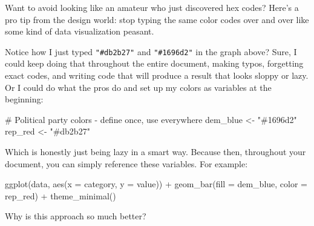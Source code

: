 \documentclass[
  letterpaper,
]{book}
\newenvironment{Shaded}{\begin{snugshade}}{\end{snugshade}}
\newcommand{\AttributeTok}[1]{\textcolor[rgb]{0.40,0.45,0.13}{#1}}
\newcommand{\CommentTok}[1]{\textcolor[rgb]{0.37,0.37,0.37}{#1}}
\newcommand{\FunctionTok}[1]{\textcolor[rgb]{0.28,0.35,0.67}{#1}}
\newcommand{\NormalTok}[1]{\textcolor[rgb]{0.00,0.23,0.31}{#1}}
\newcommand{\OtherTok}[1]{\textcolor[rgb]{0.00,0.23,0.31}{#1}}
\newcommand{\SpecialCharTok}[1]{\textcolor[rgb]{0.37,0.37,0.37}{#1}}
\newcommand{\StringTok}[1]{\textcolor[rgb]{0.13,0.47,0.30}{#1}}
\begin{document}
\begin{tcolorbox}[enhanced jigsaw, colframe=quarto-callout-tip-color-frame, breakable, arc=.35mm, bottomtitle=1mm, bottomrule=.15mm, colbacktitle=quarto-callout-tip-color!10!white, rightrule=.15mm, colback=white, opacityback=0, opacitybacktitle=0.6, coltitle=black, left=2mm, toptitle=1mm, toprule=.15mm, titlerule=0mm, leftrule=.75mm, title=\textcolor{quarto-callout-tip-color}{\faLightbulb}\hspace{0.5em}{May the Format Be With You: Brand Consistency (or: How to Look Like You
Actually Know What You're Doing)}]

Want to avoid looking like an amateur who just discovered hex codes?
Here's a pro tip from the design world: stop typing the same color codes
over and over like some kind of data visualization peasant.

Notice how I just typed \texttt{"\#db2b27"} and \texttt{"\#1696d2"} in
the graph above? Sure, I could keep doing that throughout the entire
document, making typos, forgetting exact codes, and writing code that
will produce a result that looks sloppy or lazy. Or I could do what the
pros do and set up my colors as variables at the beginning:

\begin{Shaded}
\begin{Highlighting}[]
\CommentTok{\# Political party colors {-} define once, use everywhere}
\NormalTok{dem\_blue }\OtherTok{\textless{}{-}} \StringTok{"\#1696d2"}
\NormalTok{rep\_red }\OtherTok{\textless{}{-}} \StringTok{"\#db2b27"}
\end{Highlighting}
\end{Shaded}

Which is honestly just being lazy in a smart way. Because then,
throughout your document, you can simply reference these variables. For
example:

\begin{Shaded}
\begin{Highlighting}[]
\FunctionTok{ggplot}\NormalTok{(data, }\FunctionTok{aes}\NormalTok{(}\AttributeTok{x =}\NormalTok{ category, }\AttributeTok{y =}\NormalTok{ value)) }\SpecialCharTok{+}
  \FunctionTok{geom\_bar}\NormalTok{(}\AttributeTok{fill =}\NormalTok{ dem\_blue, }\AttributeTok{color =}\NormalTok{ rep\_red) }\SpecialCharTok{+}
  \FunctionTok{theme\_minimal}\NormalTok{()}
\end{Highlighting}
\end{Shaded}

Why is this approach so much better?


\end{tcolorbox}
\end{document}
